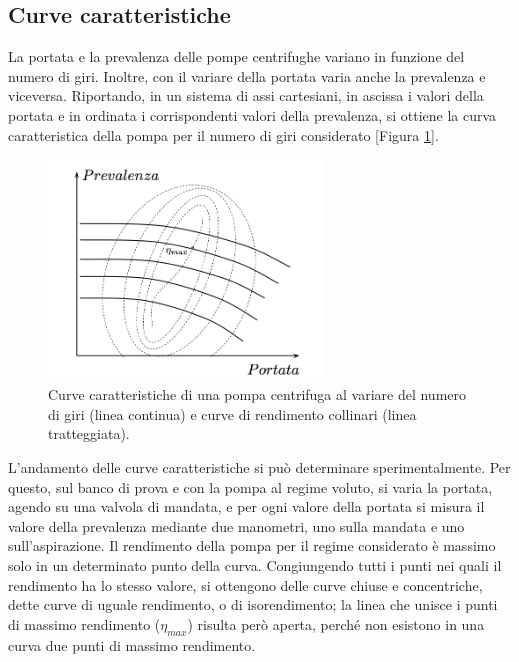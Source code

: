 \documentclass[laurea,oneside,11pt]{USiena_tesiLM3}
\begin{document}
\subsection{Curve caratteristiche}
La portata e la prevalenza delle pompe centrifughe variano in funzione del numero di giri. Inoltre, con il variare della portata varia anche la prevalenza e viceversa. Riportando, in un sistema di assi cartesiani, in ascissa i valori della portata e in ordinata i corrispondenti valori della prevalenza, si ottiene la curva caratteristica della pompa per il numero di giri considerato [Figura \ref{fig:curve_car}].

\begin{figure}[!ht]
\centering
\includegraphics[width=0.65\textwidth]{figure/curve_car} 
\caption{Curve caratteristiche di una pompa centrifuga al variare del numero di giri (linea continua) e curve di rendimento collinari (linea tratteggiata).}
\label{fig:curve_car}
\end{figure}

L'andamento delle curve caratteristiche si può determinare sperimentalmente.
Per questo, sul banco di prova e con la pompa al regime voluto, si varia la portata, agendo
su una valvola di mandata, e per ogni valore della portata si misura il valore della
prevalenza mediante due manometri, uno sulla mandata e uno sull'aspirazione.
Il rendimento della pompa per il regime considerato è massimo solo in un determinato punto della curva.
Congiungendo tutti i punti nei quali il rendimento ha lo stesso valore, si ottengono delle curve chiuse e concentriche, dette curve di uguale rendimento, o di isorendimento; la linea che unisce i punti di massimo rendimento ($\eta_{max}$) risulta però aperta, perché non esistono in una curva due punti di massimo rendimento.
\end{document}
